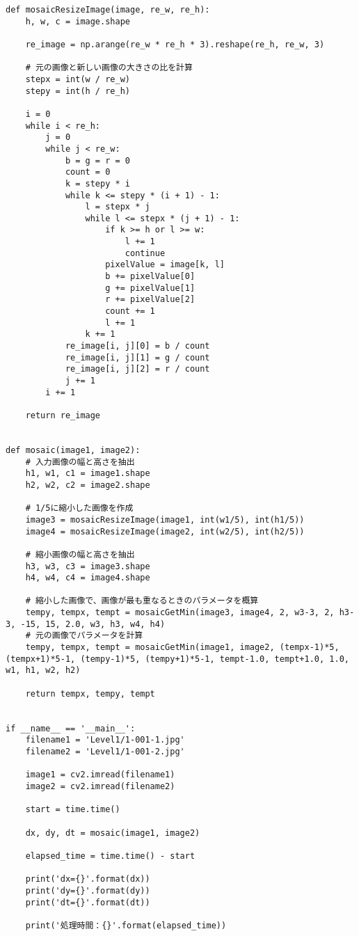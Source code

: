 \begin{lstlisting}[caption=サンプルプログラム（Python）]
def mosaicResizeImage(image, re_w, re_h):
    h, w, c = image.shape

    re_image = np.arange(re_w * re_h * 3).reshape(re_h, re_w, 3)

    # 元の画像と新しい画像の大きさの比を計算
    stepx = int(w / re_w)
    stepy = int(h / re_h)

    i = 0
    while i < re_h:
        j = 0
        while j < re_w:
            b = g = r = 0
            count = 0
            k = stepy * i
            while k <= stepy * (i + 1) - 1:
                l = stepx * j
                while l <= stepx * (j + 1) - 1:
                    if k >= h or l >= w:
                        l += 1
                        continue
                    pixelValue = image[k, l]
                    b += pixelValue[0]
                    g += pixelValue[1]
                    r += pixelValue[2]
                    count += 1
                    l += 1
                k += 1
            re_image[i, j][0] = b / count
            re_image[i, j][1] = g / count
            re_image[i, j][2] = r / count
            j += 1
        i += 1

    return re_image


def mosaic(image1, image2):
    # 入力画像の幅と高さを抽出
    h1, w1, c1 = image1.shape
    h2, w2, c2 = image2.shape

    # 1/5に縮小した画像を作成
    image3 = mosaicResizeImage(image1, int(w1/5), int(h1/5))
    image4 = mosaicResizeImage(image2, int(w2/5), int(h2/5))

    # 縮小画像の幅と高さを抽出
    h3, w3, c3 = image3.shape
    h4, w4, c4 = image4.shape

    # 縮小した画像で、画像が最も重なるときのパラメータを概算
    tempy, tempx, tempt = mosaicGetMin(image3, image4, 2, w3-3, 2, h3-3, -15, 15, 2.0, w3, h3, w4, h4)
    # 元の画像でパラメータを計算
    tempy, tempx, tempt = mosaicGetMin(image1, image2, (tempx-1)*5, (tempx+1)*5-1, (tempy-1)*5, (tempy+1)*5-1, tempt-1.0, tempt+1.0, 1.0, w1, h1, w2, h2)

    return tempx, tempy, tempt


if __name__ == '__main__':
    filename1 = 'Level1/1-001-1.jpg'
    filename2 = 'Level1/1-001-2.jpg'

    image1 = cv2.imread(filename1)
    image2 = cv2.imread(filename2)

    start = time.time()

    dx, dy, dt = mosaic(image1, image2)

    elapsed_time = time.time() - start

    print('dx={}'.format(dx))
    print('dy={}'.format(dy))
    print('dt={}'.format(dt))

    print('処理時間：{}'.format(elapsed_time))
    
\end{lstlisting}
